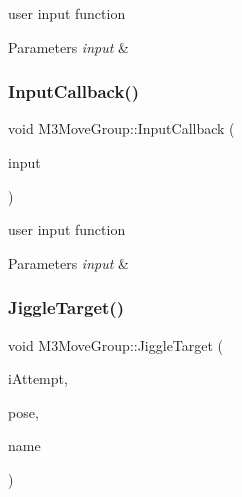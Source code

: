 user input function 


\begin{DoxyParams}{Parameters}
{\em input} & \\
\hline
\end{DoxyParams}
\mbox{\label{classM3MoveGroup_a0d53e8cfafd00e1a22f1cf5e091b63a1}} 
\subsubsection{\texorpdfstring{Input\+Callback()}{InputCallback()}\hspace{0.1cm}{\footnotesize\ttfamily [2/2]}}
{\footnotesize\ttfamily void M3\+Move\+Group\+::\+Input\+Callback (\begin{DoxyParamCaption}\item[{const std\+\_\+msgs\+::\+Int32\+Const\+Ptr \&}]{input }\end{DoxyParamCaption})\hspace{0.3cm}{\ttfamily [inline]}}



user input function 


\begin{DoxyParams}{Parameters}
{\em input} & \\
\hline
\end{DoxyParams}
\mbox{\label{classM3MoveGroup_adf12117d8738588cadfa6ab62e008fea}} 
\subsubsection{\texorpdfstring{Jiggle\+Target()}{JiggleTarget()}\hspace{0.1cm}{\footnotesize\ttfamily [1/4]}}
{\footnotesize\ttfamily void M3\+Move\+Group\+::\+Jiggle\+Target (\begin{DoxyParamCaption}\item[{int}]{i\+Attempt,  }\item[{geometry\+\_\+msgs\+::\+Pose}]{pose,  }\item[{std\+::string}]{name }\end{DoxyParamCaption})\hspace{0.3cm}{\ttfamily [inline]}}



